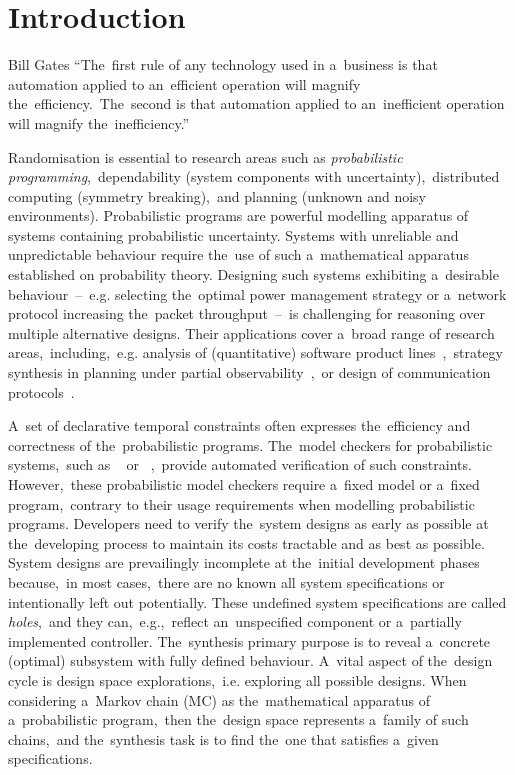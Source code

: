 \chapter{Introduction}

\label{introduction}
\begin{chapquote}{Bill Gates}
``The~first rule of any technology used in a~business is that automation applied to an~efficient operation will magnify the~efficiency.~The~second is that automation applied to an~inefficient operation will magnify the~inefficiency.''
\end{chapquote}

Randomisation is essential to research areas such as \textit{probabilistic programming},~dependability (system components with uncertainty),~distributed computing (symmetry breaking),~and planning (unknown and noisy environments).
Probabilistic programs are powerful modelling apparatus of systems containing probabilistic uncertainty.
Systems with unreliable and unpredictable behaviour require the~use of such a~mathematical apparatus established on probability theory.
Designing such systems exhibiting a~desirable behaviour \,--\, e.g. selecting the~optimal power management strategy or a~network protocol increasing the~packet throughput \,--\, is challenging for reasoning over multiple alternative designs.
Their applications cover a~broad range of research areas,~including,~e.g. analysis of (quantitative) software product lines~\cite{sw-product-lines,spl2},~strategy synthesis in planning under partial observability~\cite{pomdp1,pomdp2},~or design of communication protocols~\cite{herman1,herman2}.


A~set of declarative temporal constraints often expresses the~efficiency and correctness of the~probabilistic programs.
The~model checkers for probabilistic systems,~such as \storm{}~\cite{STORM} or \prism{}~\cite{KNP11},~provide automated verification of such constraints.
However,~these probabilistic model checkers require a~fixed model or a~fixed program,~contrary to their usage requirements when modelling probabilistic programs.
Developers need to verify the~system designs as early as possible at the~developing process to maintain its costs tractable and as best as possible.
System designs are prevailingly incomplete at the~initial development phases because,~in most cases,~there are no known all system specifications or intentionally left out potentially.
These undefined system specifications are called \textit{holes},~and they can,~e.g.,~reflect an~unspecified component  or a~partially implemented controller.
The~synthesis primary purpose is to reveal a~concrete (optimal) subsystem with fully defined behaviour.
A~vital aspect of the~design cycle is design space explorations,~i.e. exploring all possible designs.
When considering a~Markov chain (MC) as the~mathematical apparatus of a~probabilistic program,~then the~design space represents a~family of such chains,~and the~synthesis task is to find the~one that satisfies a~given specifications.

